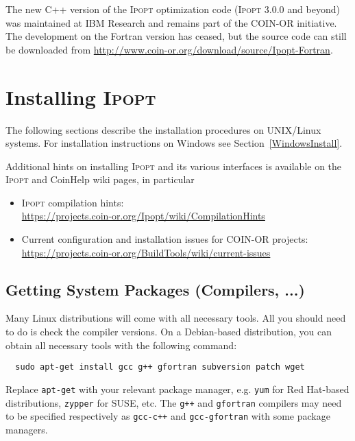 \documentclass[10pt]{article}
\newcommand{\Ipopt}{\textsc{Ipopt}\xspace}
\begin{document}
The new C++ version of the \Ipopt optimization code (\Ipopt 3.0.0
and beyond) was maintained at IBM Research and remains part of the
COIN-OR initiative. The development on the Fortran version has
ceased, but the source code can still be downloaded from \url{http://www.coin-or.org/download/source/Ipopt-Fortran}.

\section{Installing \Ipopt}\label{Installing}

The following sections describe the installation procedures on
UNIX/Linux systems.  For installation instructions on Windows
see Section~\ref{WindowsInstall}.

Additional hints on installing \Ipopt and its various interfaces is available
on the \Ipopt and CoinHelp wiki pages, in particular
\begin{itemize}
\item \Ipopt compilation hints:\\
  \url{https://projects.coin-or.org/Ipopt/wiki/CompilationHints}
\item Current configuration and installation issues for COIN-OR projects:\\
  \url{https://projects.coin-or.org/BuildTools/wiki/current-issues}
\end{itemize}

\subsection{Getting System Packages (Compilers, ...)}

Many Linux distributions will come with all necessary tools. All you should need to do is check the compiler versions. On a Debian-based distribution, you can obtain all necessary tools with the following command:
\begin{verbatim}
  sudo apt-get install gcc g++ gfortran subversion patch wget
\end{verbatim}
Replace {\tt apt-get} with your relevant package manager, e.g. {\tt yum} for Red Hat-based distributions, {\tt zypper} for SUSE, etc. The {\tt g++} and {\tt gfortran} compilers may need to be specified respectively as {\tt gcc-c++} and {\tt gcc-gfortran} with some package managers.
\end{document}
